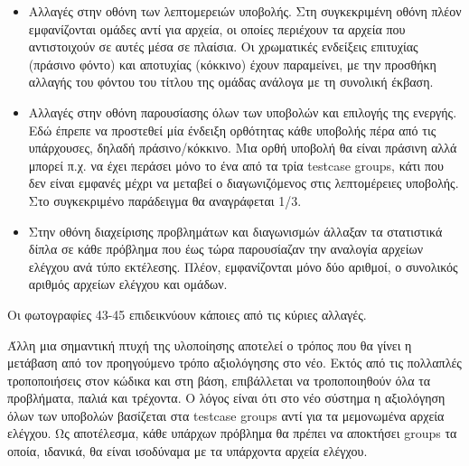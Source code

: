\documentclass[diploma]{softlab-thesis}
\begin{document}
\begin{itemize}
    \item Αλλαγές στην οθόνη των λεπτομερειών υποβολής. Στη συγκεκριμένη
      οθόνη πλέον εμφανίζονται ομάδες αντί για αρχεία, οι οποίες περιέχουν
      τα αρχεία που αντιστοιχούν σε αυτές μέσα σε πλαίσια. Οι χρωματικές ενδείξεις
      επιτυχίας (πράσινο φόντο) και αποτυχίας (κόκκινο) έχουν παραμείνει, με την
      προσθήκη αλλαγής του φόντου του τίτλου της ομάδας ανάλογα με τη συνολική
      έκβαση.

    \item Αλλαγές στην οθόνη παρουσίασης όλων των υποβολών και επιλογής της ενεργής.
      Εδώ έπρεπε να προστεθεί μία ένδειξη ορθότητας κάθε υποβολής πέρα από τις
      υπάρχουσες, δηλαδή πράσινο/κόκκινο. Μια ορθή υποβολή θα είναι πράσινη αλλά
      μπορεί π.χ. να έχει περάσει μόνο το ένα από τα τρία testcase groups, κάτι
      που δεν είναι εμφανές μέχρι να μεταβεί ο διαγωνιζόμενος στις λεπτομέρειες
      υποβολής. Στο συγκεκριμένο παράδειγμα θα αναγράφεται 1/3.

    \item Στην οθόνη διαχείρισης προβλημάτων και διαγωνισμών άλλαξαν τα στατιστικά
      δίπλα σε κάθε πρόβλημα που έως τώρα παρουσίαζαν την αναλογία αρχείων ελέγχου
      ανά τύπο εκτέλεσης. Πλέον, εμφανίζονται μόνο δύο αριθμοί, ο συνολικός αριθμός
      αρχείων ελέγχου και ομάδων.

\end{itemize}

Οι φωτογραφίες 43-45 επιδεικνύουν κάποιες από τις κύριες αλλαγές.

\bigskip

Άλλη μια σημαντική πτυχή της υλοποίησης αποτελεί ο τρόπος που θα γίνει η
μετάβαση από τον προηγούμενο τρόπο αξιολόγησης στο νέο. Εκτός από τις πολλαπλές
τροποποιήσεις στον κώδικα και στη βάση, επιβάλλεται να τροποποιηθούν όλα τα
προβλήματα, παλιά και τρέχοντα. Ο λόγος είναι ότι στο νέο σύστημα η αξιολόγηση όλων
των υποβολών βασίζεται στα testcase groups αντί για τα μεμονωμένα αρχεία ελέγχου.
Ως αποτέλεσμα, κάθε υπάρχων πρόβλημα θα πρέπει να αποκτήσει groups τα οποία,
ιδανικά, θα είναι ισοδύναμα  με τα υπάρχοντα αρχεία ελέγχου.

\bigskip
\end{document}
